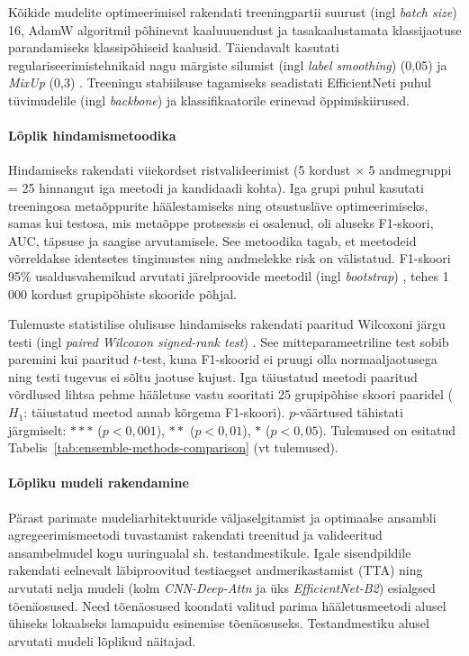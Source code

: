     Kõikide mudelite optimeerimisel rakendati treeningpartii suurust (ingl \textit{batch size}) 16, AdamW algoritmil põhinevat kaaluuuendust \parencite{loshchilov_decoupled_2017} ja tasakaalustamata klassijaotuse parandamiseks klassipõhiseid kaalusid. Täiendavalt kasutati regulariseerimistehnikaid nagu märgiste silumist (ingl \textit{label smoothing}) (0,05) \parencite{muller_when_2019} ja \textit{MixUp} (0,3) \parencite{zhang_mixup_2017}. Treeningu stabiilsuse tagamiseks seadistati EfficientNeti puhul tüvimudelile (ingl \textit{backbone}) ja klassifikaatorile erinevad õppimiskiirused.


    \paragraph{Lõplik hindamismetoodika}

    Hindamiseks rakendati viiekordset ristvalideerimist (5 kordust $\times$ 5 andmegruppi = 25 hinnangut iga meetodi ja kandidaadi kohta). Iga grupi puhul kasutati treeningosa metaõppurite häälestamiseks ning otsustusläve optimeerimiseks, samas kui testosa, mis metaõppe protsessis ei osalenud, oli aluseks F1-skoori, AUC, täpsuse ja saagise arvutamisele. See metoodika tagab, et meetodeid võrreldakse identsetes tingimustes ning andmelekke risk on välistatud. F1-skoori 95\% usaldusvahemikud arvutati järelproovide meetodil (ingl \textit{bootstrap}) \parencite{efron_introduction_1993}, tehes 1\,000 kordust grupipõhiste skooride põhjal.

    Tulemuste statistilise olulisuse hindamiseks rakendati paaritud Wilcoxoni järgu testi (ingl \textit{paired Wilcoxon signed-rank test}) \parencite{wilcoxon_individual_1945}. See mitteparameetriline test sobib paremini kui paaritud $t$-test, kuna F1-skoorid ei pruugi olla normaaljaotusega ning testi tugevus ei sõltu jaotuse kujust. Iga täiustatud meetodi paaritud võrdlused lihtsa pehme hääletuse vastu sooritati 25 grupipõhise skoori paaridel ($H_1$: täiustatud meetod annab kõrgema F1-skoori). $p$-väärtused tähistati järgmiselt: $***$ ($p<0{,}001$), $**$ ($p<0{,}01$), $*$ ($p<0{,}05$). Tulemused on esitatud Tabelis~\ref{tab:ensemble-methods-comparison} (vt tulemused).

    \paragraph{Lõpliku mudeli rakendamine}

    Pärast parimate mudeliarhitektuuride väljaselgitamist ja optimaalse ansambli agregeerimismeetodi tuvastamist rakendati treenitud ja valideeritud ansambelmudel kogu uuringualal sh. testandmestikule. Igale sisendpildile rakendati eelnevalt läbiproovitud testiaegset andmerikastamist (TTA) ning arvutati nelja mudeli (kolm \textit{CNN-Deep-Attn} ja üks \textit{EfficientNet-B2}) esialgsed tõenäosused. Need tõenäosused koondati valitud parima hääletusmeetodi alusel ühiseks lokaalseks lamapuidu esinemise tõenäosuseks. Testandmestiku alusel arvutati mudeli lõplikud näitajad.

